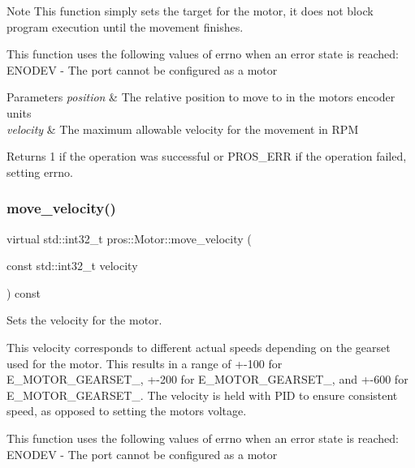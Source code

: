 \begin{DoxyNote}{Note}
This function simply sets the target for the motor, it does not block program execution until the movement finishes.
\end{DoxyNote}
This function uses the following values of errno when an error state is reached\+: E\+N\+O\+D\+EV -\/ The port cannot be configured as a motor


\begin{DoxyParams}{Parameters}
{\em position} & The relative position to move to in the motor\textquotesingle{}s encoder units \\
\hline
{\em velocity} & The maximum allowable velocity for the movement in R\+PM\\
\hline
\end{DoxyParams}
\begin{DoxyReturn}{Returns}
1 if the operation was successful or P\+R\+O\+S\+\_\+\+E\+RR if the operation failed, setting errno. 
\end{DoxyReturn}
\mbox{\label{classpros_1_1Motor_a797de937c2d550c3fa199806db07dbcc}} 
\subsubsection{\texorpdfstring{move\+\_\+velocity()}{move\_velocity()}}
{\footnotesize\ttfamily virtual std\+::int32\+\_\+t pros\+::\+Motor\+::move\+\_\+velocity (\begin{DoxyParamCaption}\item[{const std\+::int32\+\_\+t}]{velocity }\end{DoxyParamCaption}) const\hspace{0.3cm}{\ttfamily [virtual]}}

Sets the velocity for the motor.

This velocity corresponds to different actual speeds depending on the gearset used for the motor. This results in a range of +-\/100 for E\+\_\+\+M\+O\+T\+O\+R\+\_\+\+G\+E\+A\+R\+S\+E\+T\+\_, +-\/200 for E\+\_\+\+M\+O\+T\+O\+R\+\_\+\+G\+E\+A\+R\+S\+E\+T\+\_, and +-\/600 for E\+\_\+\+M\+O\+T\+O\+R\+\_\+\+G\+E\+A\+R\+S\+E\+T\+\_. The velocity is held with P\+ID to ensure consistent speed, as opposed to setting the motor\textquotesingle{}s voltage.

This function uses the following values of errno when an error state is reached\+: E\+N\+O\+D\+EV -\/ The port cannot be configured as a motor


